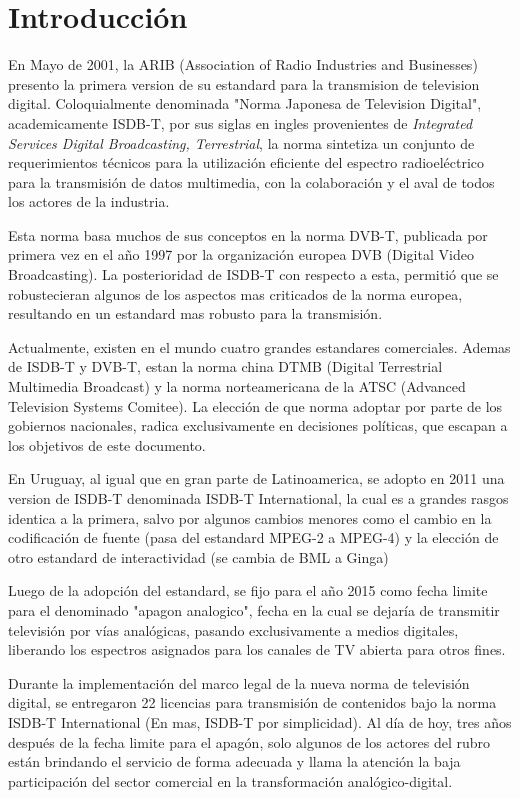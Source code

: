\chapter{Introducción}

En Mayo de 2001, la ARIB (Association of Radio Industries and Businesses)\cite{ARIB} presento la primera version de su estandard para la transmision de television digital. Coloquialmente denominada "Norma Japonesa de Television Digital", academicamente ISDB-T, por sus siglas en ingles provenientes de \textit{Integrated Services Digital Broadcasting, Terrestrial}, la norma sintetiza un conjunto de requerimientos técnicos para la utilización eficiente del espectro radioeléctrico para la transmisión de datos multimedia, con la colaboración y el aval de todos los actores de la industria.

Esta norma basa muchos de sus conceptos en la norma DVB-T, publicada por primera vez en el año 1997 por la organización europea DVB (Digital Video Broadcasting). La posterioridad de ISDB-T con respecto a esta, permitió que se robustecieran algunos de los aspectos mas criticados de la norma europea, resultando en un estandard mas robusto para la transmisión.

Actualmente, existen en el mundo cuatro grandes estandares comerciales. Ademas de ISDB-T y DVB-T, estan la norma china DTMB (Digital Terrestrial Multimedia Broadcast) y la norma norteamericana de la ATSC (Advanced Television Systems Comitee). La elección de que norma adoptar por parte de los gobiernos nacionales, radica exclusivamente en decisiones políticas, que escapan a los objetivos de este documento.

En Uruguay, al igual que en gran parte de Latinoamerica, se adopto en 2011 una version de ISDB-T denominada ISDB-T International, la cual es a grandes rasgos identica a la primera, salvo por algunos cambios menores como el cambio en la codificación de fuente (pasa del estandard MPEG-2 a MPEG-4) y la elección de otro estandard de interactividad (se cambia de BML a Ginga)

Luego de la adopción del estandard, se fijo para el año 2015 como fecha limite para el denominado "apagon analogico", fecha en la cual se dejaría de transmitir televisión por vías analógicas, pasando exclusivamente a medios digitales, liberando los espectros asignados para los canales de TV abierta para otros fines. 

Durante la implementación del marco legal de la nueva norma de televisión digital, se entregaron 22 licencias para transmisión de contenidos bajo la norma ISDB-T International (En mas, ISDB-T por simplicidad). Al día de hoy, tres años después de la fecha limite para el apagón, solo algunos de los actores del rubro están brindando el servicio de forma adecuada y llama la atención la baja participación del sector comercial en la transformación analógico-digital. 

